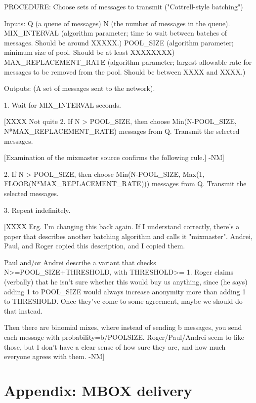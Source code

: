 PROCEDURE: Choose sets of messages to transmit ("Cottrell-style batching")

Inputs: Q (a queue of messages)
        N (the number of messages in the queue).
	MIX_INTERVAL (algorithm parameter; time to wait between
                      batches of messages.  Should be around XXXXX.)
        POOL_SIZE (algorithm parameter; minimum size of pool.  Should
                   be at least XXXXXXXX)
        MAX_REPLACEMENT_RATE (algorithm parameter; largest allowable
                   rate for messages to be removed from the
                   pool. Should be between XXXX and XXXX.)

Outputs: (A set of messages sent to the network).

1. Wait for MIX_INTERVAL seconds.

[XXXX Not quite
  2. If N > POOL_SIZE, then choose Min(N-POOL_SIZE, N*MAX_REPLACEMENT_RATE)
     messages from Q.  Transmit the selected messages.

   [Examination of the mixmaster source confirms the following rule.] -NM]

2. If N > POOL_SIZE, then choose Min(N-POOL_SIZE, 
                                     Max(1, FLOOR(N*MAX_REPLACEMENT_RATE)))
   messages from Q.  Transmit the selected messages.

3. Repeat indefinitely.

[XXXX Erg.  I'm changing this back again.  If I understand correctly,
   there's a paper that describes another batching algorithm and calls
   it "mixmaster".  Andrei, Paul, and Roger copied this description, and
   I copied them. 

   Paul and/or Andrei describe a variant that checks N>=POOL_SIZE+THRESHOLD, 
   with THRESHOLD>= 1.  Roger claims (verbally) that he isn't sure whether
   this would buy us anything, since (he says) adding 1 to POOL_SIZE would
   always increase anonymity more than adding 1 to THRESHOLD.  Once they've
   come to some agreement, maybe we should do that instead.

   Then there are binomial mixes, where instead of sending b messages,
   you send each message with probability=b/POOLSIZE.  Roger/Paul/Andrei
   seem to like those, but I don't have a clear sense of how sure they are,
   and how much everyone agrees with them. -NM]
  
\section{Appendix: MBOX delivery}


